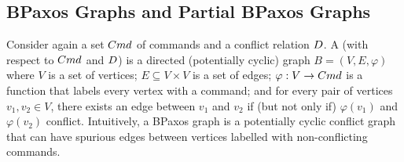 
\subsection{BPaxos Graphs and Partial BPaxos Graphs}


Consider again a set $Cmd$ of commands and a conflict relation $D$. A
 (with respect to $Cmd$ and $D$) is a directed
(potentially cyclic) graph $B = (V, E, \varphi)$ where
%
  $V$ is a set of vertices;
%
  $E \subseteq V \times V$ is a set of edges;
%
  $\varphi: V \to Cmd$ is a function that labels every vertex with a command;
  and
%
  for every pair of vertices $v_1, v_2 \in V$, there exists an edge between
  $v_1$ and $v_2$ if (but not only if) $\varphi(v_1)$ and $\varphi(v_2)$
  conflict.
%
Intuitively, a BPaxos graph is a potentially cyclic conflict graph that can
have spurious edges between vertices labelled with non-conflicting commands.

